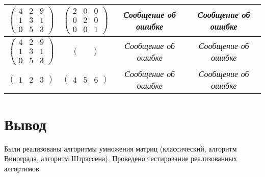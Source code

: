 \begin{table}[H]
\begin{center}
\begin{tabular}{|c|c|c|c|}
            \hline
            $\begin{pmatrix}
                4 & 2 & 9 \\
                1 & 3 & 1 \\
                0 & 5 & 3
            \end{pmatrix}$ &
            $\begin{pmatrix}
                2 & 0 & 0 \\
                0 & 2 & 0 \\
                0 & 0 & 1                
            \end{pmatrix}$ &
            \textit{Сообщение об ошибке} &
            \textit{Сообщение об ошибке} \\
            \hline
            $\begin{pmatrix}
                4 & 2 & 9 \\
                1 & 3 & 1 \\
                0 & 5 & 3
            \end{pmatrix}$ &
            $\begin{pmatrix}
                &
            \end{pmatrix}$ &
            \textit{Сообщение об ошибке} &
            \textit{Сообщение об ошибке} \\
            \hline
            $\begin{pmatrix}
                1 & 2 & 3
            \end{pmatrix}$ &
            $\begin{pmatrix}
                4 & 5 & 6
            \end{pmatrix}$ &
            \textit{Сообщение об ошибке} &
            \textit{Сообщение об ошибке} \\
            \hline
        \end{tabular}
	\end{center}
\end{table}

\section*{Вывод}

Были реализованы алгоритмы умножения матриц (классический, алгоритм Винограда, алгоритм Штрассена).
Проведено тестирование реализованных алгортимов.
